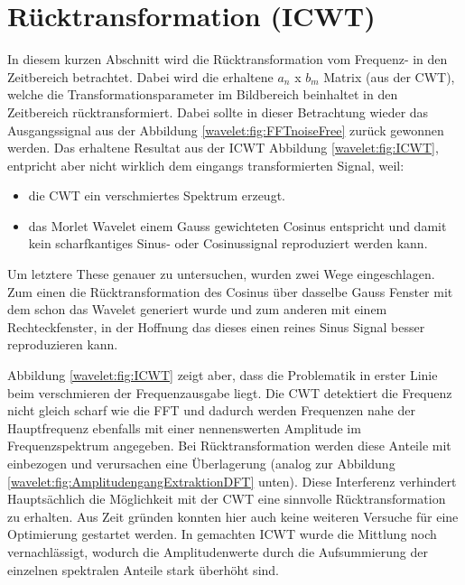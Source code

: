 %
%
%
%
\section{Rücktransformation (ICWT)
	\label{wavelets:section:teil5}}

In diesem kurzen Abschnitt wird die Rücktransformation vom Frequenz- in den Zeitbereich betrachtet. Dabei wird die erhaltene $a_n$ x $b_m$ Matrix (aus der CWT), welche die Transformationsparameter im Bildbereich beinhaltet in den Zeitbereich rücktransformiert. Dabei sollte in dieser Betrachtung wieder das Ausgangssignal aus der Abbildung \ref{wavelet:fig:FFTnoiseFree} zurück gewonnen werden.
Das erhaltene Resultat aus der ICWT Abbildung \ref{wavelet:fig:ICWT}, entpricht aber nicht wirklich dem eingangs transformierten Signal, weil:

\begin{itemize}
	\item die CWT ein verschmiertes Spektrum erzeugt.
	\item das Morlet Wavelet einem Gauss gewichteten Cosinus entspricht und damit kein scharfkantiges Sinus- oder Cosinussignal reproduziert werden kann.
\end{itemize}

Um letztere These genauer zu untersuchen, wurden zwei Wege eingeschlagen. Zum einen die Rücktransformation des Cosinus über dasselbe Gauss Fenster mit dem schon das Wavelet generiert wurde und zum anderen mit einem Rechteckfenster, in der Hoffnung das dieses einen reines Sinus Signal besser reproduzieren kann.

Abbildung \ref{wavelet:fig:ICWT} zeigt aber, dass die Problematik in erster Linie beim verschmieren der Frequenzausgabe liegt. Die CWT detektiert die Frequenz nicht gleich scharf wie die FFT und dadurch werden Frequenzen nahe der Hauptfrequenz ebenfalls mit einer nennenswerten Amplitude im Frequenzspektrum angegeben. Bei Rücktransformation werden diese Anteile mit einbezogen und verursachen eine Überlagerung (analog zur Abbildung \ref{wavelet:fig:AmplitudengangExtraktionDFT} unten). Diese Interferenz verhindert Hauptsächlich die Möglichkeit mit der CWT eine sinnvolle Rücktransformation zu erhalten. Aus Zeit gründen konnten hier auch keine weiteren Versuche für eine Optimierung gestartet werden. In gemachten ICWT wurde die Mittlung noch vernachlässigt, wodurch die Amplitudenwerte durch die Aufsummierung der einzelnen spektralen Anteile stark überhöht sind.

